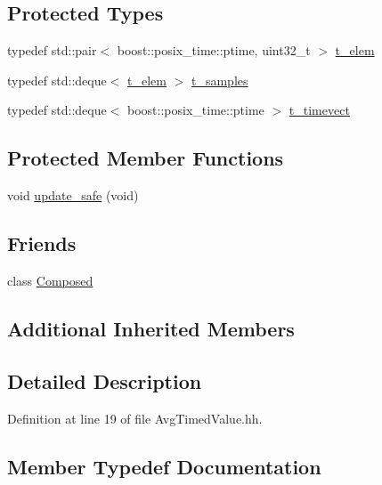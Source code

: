 \subsection*{Protected Types}
\begin{DoxyCompactItemize}
\item 
typedef std\+::pair$<$ boost\+::posix\+\_\+time\+::ptime, uint32\+\_\+t $>$ \hyperlink{classxtd_1_1counters_1_1AvgTimedValue_a1495aff37899fa6b011aed1b4283db18}{t\+\_\+elem}
\item 
typedef std\+::deque$<$ \hyperlink{classxtd_1_1counters_1_1AvgTimedValue_a1495aff37899fa6b011aed1b4283db18}{t\+\_\+elem} $>$ \hyperlink{classxtd_1_1counters_1_1AvgTimedValue_a71d5e67cb282762c880dc4986e5a8d7c}{t\+\_\+samples}
\item 
typedef std\+::deque$<$ boost\+::posix\+\_\+time\+::ptime $>$ \hyperlink{classxtd_1_1counters_1_1AvgTimedValue_a901afa3b937939c2132a593d4a801cad}{t\+\_\+timevect}
\end{DoxyCompactItemize}
\subsection*{Protected Member Functions}
\begin{DoxyCompactItemize}
\item 
void \hyperlink{classxtd_1_1counters_1_1AvgTimedValue_a1430fd5ff91e960a251b0656c2b5c0ca}{update\+\_\+safe} (void)
\end{DoxyCompactItemize}
\subsection*{Friends}
\begin{DoxyCompactItemize}
\item 
class \hyperlink{classxtd_1_1counters_1_1AvgTimedValue_a93e934ad70d5b32b14beed5572450abf}{Composed}
\end{DoxyCompactItemize}
\subsection*{Additional Inherited Members}


\subsection{Detailed Description}


Definition at line 19 of file Avg\+Timed\+Value.\+hh.



\subsection{Member Typedef Documentation}
